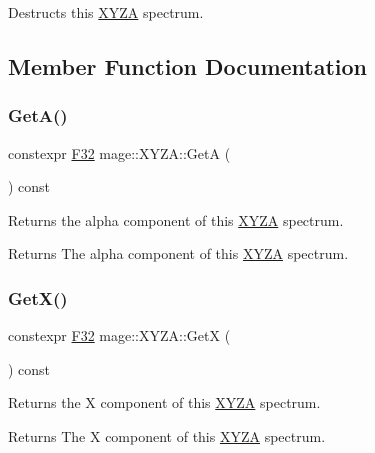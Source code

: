 Destructs this \mbox{\hyperlink{structmage_1_1_x_y_z_a}{X\+Y\+ZA}} spectrum. 

\subsection{Member Function Documentation}
\mbox{\label{structmage_1_1_x_y_z_a_a97ee3d29d5a8f2b7cd005458fc5a2f25}} 
\subsubsection{\texorpdfstring{Get\+A()}{GetA()}}
{\footnotesize\ttfamily constexpr \mbox{\hyperlink{namespacemage_aa97e833b45f06d60a0a9c4fc22ae02c0}{F32}} mage\+::\+X\+Y\+Z\+A\+::\+GetA (\begin{DoxyParamCaption}{ }\end{DoxyParamCaption}) const\hspace{0.3cm}{\ttfamily [noexcept]}}

Returns the alpha component of this \mbox{\hyperlink{structmage_1_1_x_y_z_a}{X\+Y\+ZA}} spectrum.

\begin{DoxyReturn}{Returns}
The alpha component of this \mbox{\hyperlink{structmage_1_1_x_y_z_a}{X\+Y\+ZA}} spectrum. 
\end{DoxyReturn}
\mbox{\label{structmage_1_1_x_y_z_a_ad8a87f85d80f41961d88657150d62d83}} 
\subsubsection{\texorpdfstring{Get\+X()}{GetX()}}
{\footnotesize\ttfamily constexpr \mbox{\hyperlink{namespacemage_aa97e833b45f06d60a0a9c4fc22ae02c0}{F32}} mage\+::\+X\+Y\+Z\+A\+::\+GetX (\begin{DoxyParamCaption}{ }\end{DoxyParamCaption}) const\hspace{0.3cm}{\ttfamily [noexcept]}}

Returns the X component of this \mbox{\hyperlink{structmage_1_1_x_y_z_a}{X\+Y\+ZA}} spectrum.

\begin{DoxyReturn}{Returns}
The X component of this \mbox{\hyperlink{structmage_1_1_x_y_z_a}{X\+Y\+ZA}} spectrum. 
\end{DoxyReturn}
\mbox{\label{structmage_1_1_x_y_z_a_a218a44b26cb020ff6ebd730772425097}} 
